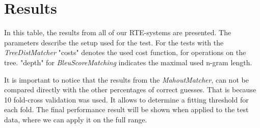 
\section{Results}

In this table, the results from all of our RTE-systems are presented.
The parameters describe the setup used for the test. For the tests with
the \textit{TreeDistMatcher} "costs" denotes the used cost function, for 
operations on the tree. "depth" for \textit{BleuScoreMatching} indicates 
the maximal used n-gram length.

It is important to notice that the results from the \textit{MahoutMatcher},
can not be compared directly with the other percentages of correct guesses.
That is because 10 fold-cross validation was used. It allows to determine
a fitting threshold for each fold.
The final performance result will be shown when applied to the test data,
where we can apply it on the full range. 

